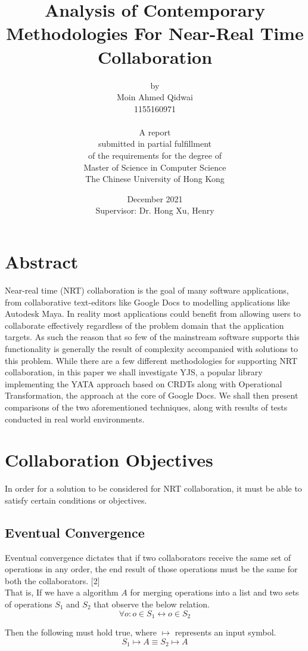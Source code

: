 \documentclass[9pt, titlepage]{article}
\title{Analysis of Contemporary Methodologies For Near-Real Time Collaboration}
\author{by \\ Moin Ahmed Qidwai \\ 1155160971 \\\\
A report \\
submitted in partial fulfillment \\
of the requirements for the degree of \\
Master of Science in Computer Science \\
The Chinese University of Hong Kong
}
\date{December 2021 \\ Supervisor: Dr. Hong Xu, Henry}
\begin{document}
  \maketitle
  \tableofcontents
  \newpage

  \section{Abstract}
  Near-real time (NRT) collaboration is the goal of many software applications, from collaborative text-editors like Google Docs to modelling applications like Autodesk Maya.
  In reality most applications could benefit from allowing users to collaborate effectively regardless of the problem domain that the application targets.
  As such the reason that so few of the mainstream software supports this functionality is generally the result of complexity accompanied with solutions to this problem.
  While there are a few different methodologies for supporting NRT collaboration, in this paper we shall investigate YJS, a popular library implementing the YATA approach based on CRDTs along with 
  Operational Transformation, the approach at the core of Google Docs. We shall then present comparisons of the two aforementioned techniques, along with results of tests conducted in real world environments.

  \section{Collaboration Objectives}
  In order for a solution to be considered for NRT collaboration, it must be able to satisfy certain conditions or objectives.
  
  \subsection{Eventual Convergence}
  Eventual convergence dictates that if two collaborators receive the same set of operations in any order,
  the end result of those operations must be the same for both the collaborators. [2]\\
  That is, If we have a algorithm \(A\) for merging operations into a list and two sets of operations \(S_{1}\) and \(S_{2}\) that observe the below relation.
  \begin{equation}
    \forall o : o \in S_{1} \leftrightarrow o \in S_{2}
  \end{equation}
  
  Then the following must hold true, where \(\mapsto\) represents an input symbol.
  \begin{equation}
     S_{1} \mapsto A \equiv S_{2} \mapsto A
  \end{equation}
\end{document}
